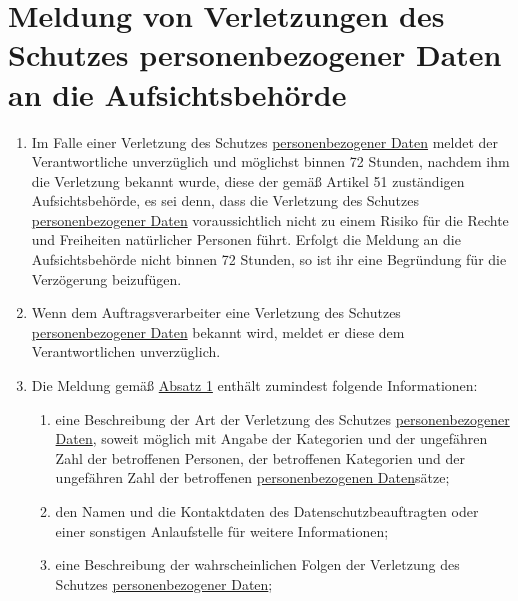 \chapter{Meldung von Verletzungen des Schutzes personenbezogener Daten an die Aufsichtsbehörde}
\label{ch:33}


\begin{enumerate}

  \item Im Falle einer Verletzung des Schutzes \hyperref[itm:04-1]{personenbezogener Daten} meldet der Verantwortliche unverzüglich und
   möglichst binnen 72 Stunden, nachdem ihm die Verletzung bekannt wurde, diese der gemäß Artikel 51 zuständigen
   Aufsichtsbehörde, es sei denn, dass die Verletzung des Schutzes \hyperref[itm:04-1]{personenbezogener Daten} voraussichtlich nicht zu
   einem Risiko für die Rechte und Freiheiten natürlicher Personen führt. Erfolgt die Meldung an die Aufsichtsbehörde
   nicht binnen 72 Stunden, so ist ihr eine Begründung für die Verzögerung beizufügen.
  \label{itm:33-1}

  \item Wenn dem Auftragsverarbeiter eine Verletzung des Schutzes \hyperref[itm:04-1]{personenbezogener Daten} bekannt wird, meldet er diese
   dem Verantwortlichen unverzüglich.
  \label{itm:33-2}

  \item Die Meldung gemäß \hyperref[itm:33-1]{Absatz 1} enthält zumindest folgende Informationen:
  \label{itm:33-3}

  \begin{enumerate}
  
    \item eine Beschreibung der Art der Verletzung des Schutzes \hyperref[itm:04-1]{personenbezogener Daten}, soweit möglich mit Angabe der
     Kategorien und der ungefähren Zahl der betroffenen Personen, der betroffenen Kategorien und der ungefähren Zahl
     der betroffenen \hyperref[itm:04-1]{personenbezogenen Daten}sätze;
    \label{itm:33-3a}

    \item den Namen und die Kontaktdaten des Datenschutzbeauftragten oder einer sonstigen Anlaufstelle für weitere
     Informationen;
    \label{itm:33-3b}

    \item eine Beschreibung der wahrscheinlichen Folgen der Verletzung des Schutzes \hyperref[itm:04-1]{personenbezogener Daten};
    \label{itm:33-3c}


\end{enumerate}
\end{enumerate}
